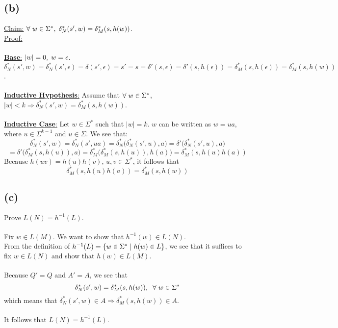 \documentclass[11pt]{article}
\begin{document}
\subsection*{(b)}
\underline{Claim:} $\forall\hspace{1mm}w\in\Sigma^*,\hspace{1mm}\delta^*_N(s',w)=\delta^*_M(s,h(w))$. \\
\underline{Proof:} \\ \\
\underline{\textbf{Base}:} $|w|=0,\hspace{1mm}w=\epsilon$. $\delta^*_N(s',w)=\delta^*_N(s',\epsilon)=\delta(s',\epsilon)=s'=s=\delta'(s,\epsilon)=\delta'(s,h(\epsilon))=\delta^*_M(s,h(\epsilon))=\delta^*_M(s,h(w))$. \\ \\
\underline{\textbf{Inductive Hypothesis}:} Assume that $\forall\hspace{1mm}w\in\Sigma^*$, $|w|<k\Rightarrow\delta^*_N(s',w)=\delta^*_M(s,h(w))$. \\ \\
\underline{\textbf{Inductive Case}:} Let $w\in\Sigma^*$ such that $|w|=k$. $w$ can be written as $w=ua$, where $u\in\Sigma^{k-1}$ and $u\in\Sigma$. We see that:
\[\delta^*_N(s',w)=\delta^*_N(s',ua)=\delta^*_N\big(\delta^*_N(s',u),a\big)=\delta'\big(\delta^*_N(s',u),a\big)\]
\[=\delta'\big(\delta^*_M(s,h(u)),a\big)=\delta^*_M\big(\delta^*_M(s,h(u)),h(a)\big)=\delta^*_M(s,h(u)h(a))\]
Because $h(uv)=h(u)h(v)$, $u,v\in\Sigma^*$, it follows that
\[\delta^*_M(s,h(u)h(a))=\delta^*_M(s,h(w))\]
\subsection*{(c)}
Prove $L(N)=h^{-1}(L)$. \\ \\
Fix $w\in L(M)$. We want to show that $h^{-1}(w)\in L(N)$. \\
From the definition of $h^{-1}(L)=\{w\in\Sigma^*\hspace{1mm}|\hspace{1mm}h(w)\in L\}$, we see that it suffices to fix $w\in L(N)$ and show that $h(w)\in L(M)$. \\ \\
Because $Q'=Q$ and $A'=A$, we see that
\[\delta^*_N(s',w)=\delta^*_M(s,h(w)), \hspace{2mm}\forall\hspace{1mm}w\in\Sigma^*\]
which means that $\delta^*_N(s',w)\in A\Rightarrow\delta^*_M(s,h(w))\in A$. \\ \\
It follows that $L(N)=h^{-1}(L)$.
\end{document}
